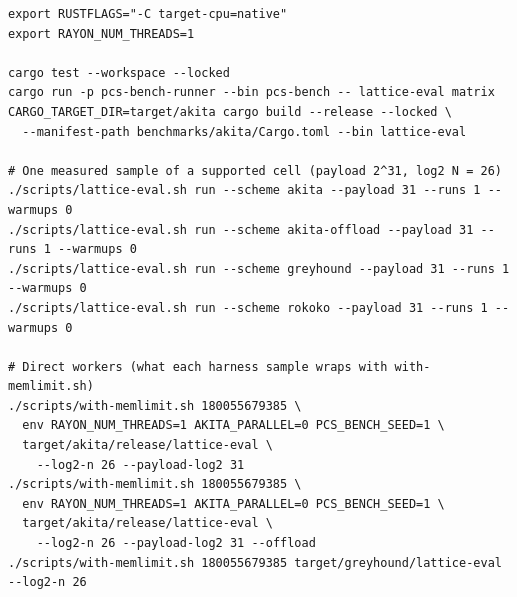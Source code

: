\begin{verbatim}
export RUSTFLAGS="-C target-cpu=native"
export RAYON_NUM_THREADS=1

cargo test --workspace --locked
cargo run -p pcs-bench-runner --bin pcs-bench -- lattice-eval matrix
CARGO_TARGET_DIR=target/akita cargo build --release --locked \
  --manifest-path benchmarks/akita/Cargo.toml --bin lattice-eval

# One measured sample of a supported cell (payload 2^31, log2 N = 26)
./scripts/lattice-eval.sh run --scheme akita --payload 31 --runs 1 --warmups 0
./scripts/lattice-eval.sh run --scheme akita-offload --payload 31 --runs 1 --warmups 0
./scripts/lattice-eval.sh run --scheme greyhound --payload 31 --runs 1 --warmups 0
./scripts/lattice-eval.sh run --scheme rokoko --payload 31 --runs 1 --warmups 0

# Direct workers (what each harness sample wraps with with-memlimit.sh)
./scripts/with-memlimit.sh 180055679385 \
  env RAYON_NUM_THREADS=1 AKITA_PARALLEL=0 PCS_BENCH_SEED=1 \
  target/akita/release/lattice-eval \
    --log2-n 26 --payload-log2 31
./scripts/with-memlimit.sh 180055679385 \
  env RAYON_NUM_THREADS=1 AKITA_PARALLEL=0 PCS_BENCH_SEED=1 \
  target/akita/release/lattice-eval \
    --log2-n 26 --payload-log2 31 --offload
./scripts/with-memlimit.sh 180055679385 target/greyhound/lattice-eval --log2-n 26
\end{verbatim}

